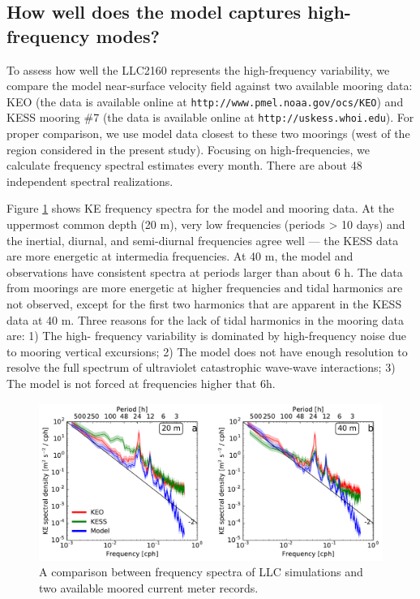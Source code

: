 \documentclass[grl]{agutex2015}
\begin{document}
\begin{article}
\subsection{How well does the model captures high-frequency modes?}
To assess how well the LLC2160 represents the high-frequency variability,
we compare the model near-surface velocity field against two available
mooring data: KEO (the data is available online at \texttt{http://www.pmel.noaa.gov/ocs/KEO})
and KESS mooring $\#$7 (the data is available online at \texttt{http://uskess.whoi.edu}).
For proper comparison, we use model data closest to these two moorings (west of
the region considered in the present study). Focusing on high-frequencies, we
calculate frequency spectral estimates every month. There are about 48 independent
spectral realizations.

Figure \ref{figA1} shows KE frequency spectra for the model and mooring data.
At the uppermost common depth (20 m), very low frequencies (periods > 10 days)
and the inertial, diurnal, and semi-diurnal frequencies agree well --- the KESS
data are more energetic at intermedia frequencies. At 40 m, the model and observations
have consistent spectra at periods larger than about 6 h. The data from moorings
are more energetic at higher frequencies and tidal harmonics are not observed,
except for the first two harmonics that are apparent in the KESS data at 40 m.
Three reasons for the lack of tidal harmonics in the mooring data are: 1) The high-
frequency variability is dominated by high-frequency noise due to mooring vertical
excursions; 2) The model does not have enough resolution to resolve the full spectrum
of ultraviolet catastrophic wave-wave interactions; 3) The model is not forced at
frequencies higher that 6h.

\begin{figure}[ht]
   \begin{center}
     \includegraphics[width=.9\textwidth]{figs/figA1.pdf}
  \caption{A comparison between frequency spectra of LLC simulations and two
  available moored current meter records.}
  \label{figA1}
  \end{center}
\end{figure}





\end{article}
\end{document}

